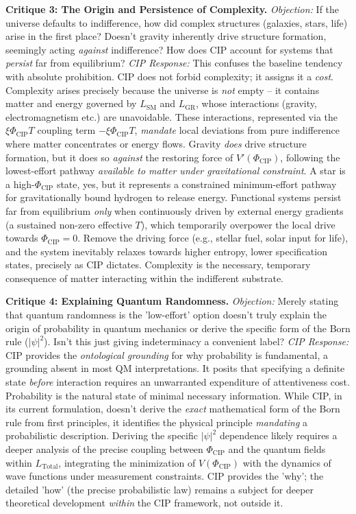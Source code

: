 \documentclass[11pt, a4paper]{article}
\newcommand{\subt}[1]{\mathrm{#1}}
\begin{document}
\textbf{Critique 3: The Origin and Persistence of Complexity.}
\textit{Objection:} If the universe defaults to indifference, how did complex structures (galaxies, stars, life) arise in the first place? Doesn't gravity inherently drive structure formation, seemingly acting \textit{against} indifference? How does CIP account for systems that \textit{persist} far from equilibrium?
\textit{CIP Response:} This confuses the baseline tendency with absolute prohibition. CIP does not forbid complexity; it assigns it a \textit{cost}. Complexity arises precisely because the universe is \textit{not} empty – it contains matter and energy governed by $L_{\subt{SM}}$ and $L_{\subt{GR}}$, whose interactions (gravity, electromagnetism etc.) are unavoidable. These interactions, represented via the $\xi\Phi_{\subt{CIP}}T$ coupling term $-\xi\Phi_{\subt{CIP}}T$, \textit{mandate} local deviations from pure indifference where matter concentrates or energy flows. Gravity \textit{does} drive structure formation, but it does so \textit{against} the restoring force of $V'(\Phi_{\subt{CIP}})$, following the lowest-effort pathway \textit{available to matter under gravitational constraint}. A star is a high-$\Phi_{\subt{CIP}}$ state, yes, but it represents a constrained minimum-effort pathway for gravitationally bound hydrogen to release energy. Functional systems persist far from equilibrium \textit{only} when continuously driven by external energy gradients (a sustained non-zero effective $T$), which temporarily overpower the local drive towards $\Phi_{\subt{CIP}}=0$. Remove the driving force (e.g., stellar fuel, solar input for life), and the system inevitably relaxes towards higher entropy, lower specification states, precisely as CIP dictates. Complexity is the necessary, temporary consequence of matter interacting within the indifferent substrate.

\textbf{Critique 4: Explaining Quantum Randomness.}
\textit{Objection:} Merely stating that quantum randomness is the 'low-effort' option doesn't truly explain the origin of probability in quantum mechanics or derive the specific form of the Born rule ($|\psi|^2$). Isn't this just giving indeterminacy a convenient label?
\textit{CIP Response:} CIP provides the \textit{ontological grounding} for why probability is fundamental, a grounding absent in most QM interpretations. It posits that specifying a definite state \textit{before} interaction requires an unwarranted expenditure of attentiveness cost. Probability is the natural state of minimal necessary information. While CIP, in its current formulation, doesn't derive the \textit{exact} mathematical form of the Born rule from first principles, it identifies the physical principle \textit{mandating} a probabilistic description. Deriving the specific $|\psi|^2$ dependence likely requires a deeper analysis of the precise coupling between $\Phi_{\subt{CIP}}$ and the quantum fields within $L_{\subt{Total}}$, integrating the minimization of $V(\Phi_{\subt{CIP}})$ with the dynamics of wave functions under measurement constraints. CIP provides the 'why'; the detailed 'how' (the precise probabilistic law) remains a subject for deeper theoretical development \textit{within} the CIP framework, not outside it.
\end{document}
